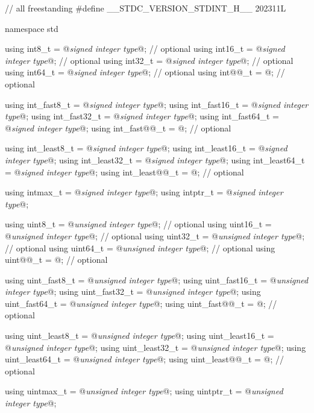 \begin{codeblock}
// all freestanding
#define __STDC_VERSION_STDINT_H__ 202311L

namespace std {
  using int8_t         = @\textit{signed integer type}@;   // optional
  using int16_t        = @\textit{signed integer type}@;   // optional
  using int32_t        = @\textit{signed integer type}@;   // optional
  using int64_t        = @\textit{signed integer type}@;   // optional
  using int@@_t         = @\seebelow@;             // optional

  using int_fast8_t    = @\textit{signed integer type}@;
  using int_fast16_t   = @\textit{signed integer type}@;
  using int_fast32_t   = @\textit{signed integer type}@;
  using int_fast64_t   = @\textit{signed integer type}@;
  using int_fast@@_t    = @\seebelow@;             // optional

  using int_least8_t   = @\textit{signed integer type}@;
  using int_least16_t  = @\textit{signed integer type}@;
  using int_least32_t  = @\textit{signed integer type}@;
  using int_least64_t  = @\textit{signed integer type}@;
  using int_least@@_t   = @\seebelow@;             // optional

  using intmax_t       = @\textit{signed integer type}@;
  using intptr_t       = @\textit{signed integer type}@;

  using uint8_t        = @\textit{unsigned integer type}@; // optional
  using uint16_t       = @\textit{unsigned integer type}@; // optional
  using uint32_t       = @\textit{unsigned integer type}@; // optional
  using uint64_t       = @\textit{unsigned integer type}@; // optional
  using uint@@_t        = @\seebelow@;             // optional

  using uint_fast8_t   = @\textit{unsigned integer type}@;
  using uint_fast16_t  = @\textit{unsigned integer type}@;
  using uint_fast32_t  = @\textit{unsigned integer type}@;
  using uint_fast64_t  = @\textit{unsigned integer type}@;
  using uint_fast@@_t   = @\seebelow@;             // optional

  using uint_least8_t  = @\textit{unsigned integer type}@;
  using uint_least16_t = @\textit{unsigned integer type}@;
  using uint_least32_t = @\textit{unsigned integer type}@;
  using uint_least64_t = @\textit{unsigned integer type}@;
  using uint_least@@_t  = @\seebelow@;             // optional

  using uintmax_t      = @\textit{unsigned integer type}@;
  using uintptr_t      = @\textit{unsigned integer type}@;
}


\end{codeblock}
